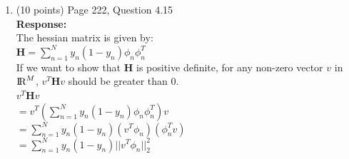\documentclass[11pt]{article}
\begin{document}
\begin{enumerate}
$\displaystyle \Rightarrow (\sum_{i=1}^N x_n x_n^T  - \frac{N_1^2}{N}||m_1||^2 - \frac{N_2^2}{N}||m_2||^2 - \frac{N_1 N_2}{N} ||m_1||^2 - \frac{N_1 N_2}{N} ||m_2||^2  + (\frac{N_1 N_2}{N} ||m_1||^2 + \frac{N_1 N_2}{N} ||m_2||^2 - 2 \frac{N_1 N_2}{N} m_1^T m_2)) w = N(m_1 - m_2)$\\
$\displaystyle \Rightarrow (\sum_{i=1}^N x_n x_n^T  - \frac{N_1^2}{N}||m_1||^2 - \frac{N_2^2}{N}||m_2||^2 - \frac{N_1 N_2}{N} ||m_1||^2 - \frac{N_1 N_2}{N} ||m_2||^2  + \frac{N_1 N_2}{N} (m_2 - m_1) (m_2 - m_1)^T) w = N(m_1 - m_2)$\\
$\displaystyle \Rightarrow (\sum_{i=1}^N x_n x_n^T  - \frac{N_1}{N}(N_1 + N_2)||m_1||^2 - \frac{N_2}{N} (N_2 + N_1)||m_2||^2+ \frac{N_1 N_2}{N} S_B) w = N(m_1 - m_2)$\\
$\displaystyle \Rightarrow (\sum_{i=1}^N x_n x_n^T  - N_1 ||m_1||^2 - N_2 ||m_2||^2+ \frac{N_1 N_2}{N} S_B) w = N(m_1 - m_2)$\\
$\displaystyle \Rightarrow (\sum_{n \epsilon C_1} (x_n x_n^T  + ||m_1||^2 - 2 m_1 x_n^T)  + \sum_{n \epsilon C_2} (x_n x_n^T  + ||m_2||^2 - 2 m_2 x_n^T) - 2N_1||m_1||^2 - 2N_2||m_2||^2 +  \sum_{n \epsilon C_1}2m_1 x_n^T +  \sum_{n \epsilon C_1}2m_2 x_n^T + \frac{N_1 N_2}{N} S_B) w = N(m_1 - m_2)$\\
$\displaystyle \Rightarrow (\sum_{n \epsilon C_1} (x_n - m_1)(x_n - m_1)^T  + \sum_{n \epsilon C_2} (x_n - m_2)(x_n - m_2)^T - 2N_1||m_1||^2 - 2N_2||m_2||^2 +  2N_1||m_1||^2 +  2N_2||m_2||^2 + \frac{N_1 N_2}{N} S_B) w = N(m_1 - m_2)$\\
$\displaystyle \Rightarrow (S_w + \frac{N_1 N_2}{N} S_B) w = N(m_1 - m_2)$ [Proved]\\
\item (10 points) Page 222, Question 4.15\\
\textbf{Response:}\\
The hessian matrix is given by:\\
$\displaystyle \textbf{H} = \sum_{n=1}^N y_n (1-y_n) \phi_n \phi_n^T$\\
If we want to show that $\textbf{H}$ is positive definite, for any non-zero vector $v$ in ${\rm\hbox{I\kern-.15em R}}^M$, $v^T \textbf{H} v$ should be greater than $0$.\\
$v^T \textbf{H} v$\\
$= v^T (\sum_{n=1}^N y_n (1-y_n) \phi_n \phi_n^T)  v$\\
$= \sum_{n=1}^N y_n (1-y_n) (v^T \phi_n) (\phi_n^T v)$\\
$= \sum_{n=1}^N y_n (1-y_n) ||v^T \phi_n||_2^2$\\


\end{enumerate}
\end{document}
